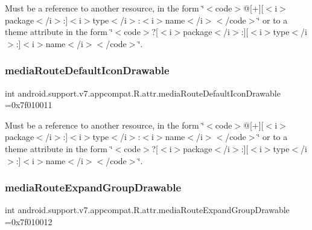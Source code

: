 Must be a reference to another resource, in the form \char`\"{}$<$code$>$@\mbox{[}+\mbox{]}\mbox{[}$<$i$>$package$<$/i$>$\+:\mbox{]}$<$i$>$type$<$/i$>$\+:$<$i$>$name$<$/i$>$$<$/code$>$\char`\"{} or to a theme attribute in the form \char`\"{}$<$code$>$?\mbox{[}$<$i$>$package$<$/i$>$\+:\mbox{]}\mbox{[}$<$i$>$type$<$/i$>$\+:\mbox{]}$<$i$>$name$<$/i$>$$<$/code$>$\char`\"{}. \mbox{\label{classandroid_1_1support_1_1v7_1_1appcompat_1_1R_1_1attr_a617bcbc08d02eaed80c601a84d0134be}} 
\subsubsection{\texorpdfstring{media\+Route\+Default\+Icon\+Drawable}{mediaRouteDefaultIconDrawable}}
{\footnotesize\ttfamily int android.\+support.\+v7.\+appcompat.\+R.\+attr.\+media\+Route\+Default\+Icon\+Drawable =0x7f010011\hspace{0.3cm}{\ttfamily [static]}}

Must be a reference to another resource, in the form \char`\"{}$<$code$>$@\mbox{[}+\mbox{]}\mbox{[}$<$i$>$package$<$/i$>$\+:\mbox{]}$<$i$>$type$<$/i$>$\+:$<$i$>$name$<$/i$>$$<$/code$>$\char`\"{} or to a theme attribute in the form \char`\"{}$<$code$>$?\mbox{[}$<$i$>$package$<$/i$>$\+:\mbox{]}\mbox{[}$<$i$>$type$<$/i$>$\+:\mbox{]}$<$i$>$name$<$/i$>$$<$/code$>$\char`\"{}. \mbox{\label{classandroid_1_1support_1_1v7_1_1appcompat_1_1R_1_1attr_aad8a33b84cf690016c01160980c54276}} 
\subsubsection{\texorpdfstring{media\+Route\+Expand\+Group\+Drawable}{mediaRouteExpandGroupDrawable}}
{\footnotesize\ttfamily int android.\+support.\+v7.\+appcompat.\+R.\+attr.\+media\+Route\+Expand\+Group\+Drawable =0x7f010012\hspace{0.3cm}{\ttfamily [static]}}

